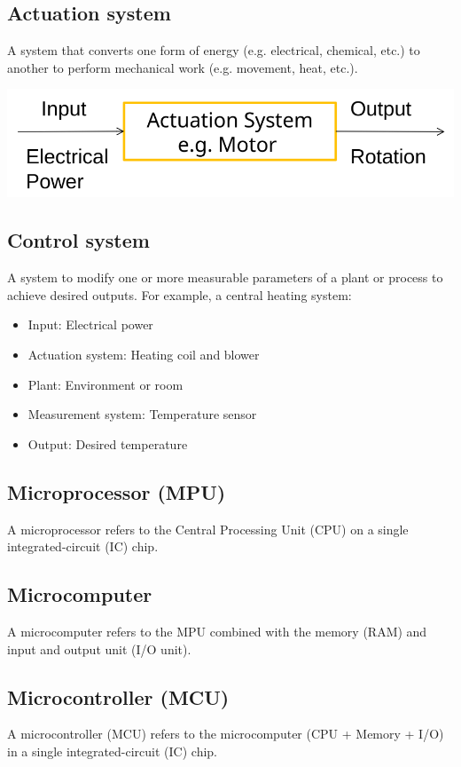 \documentclass[11pt]{article}
\begin{document}
\subsection{Actuation system}
\label{sec:org3e09752}
A system that converts one form of energy (e.g. electrical, chemical, etc.) to another to perform mechanical work (e.g. movement, heat, etc.).
\begin{center}
\includegraphics[width=.9\linewidth]{./images/actuation-system.png}
\end{center}
\subsection{Control system}
\label{sec:org28db679}
A system to modify one or more measurable parameters of a plant or process to achieve desired outputs. For example, a central heating system:
\begin{itemize}
\item Input: Electrical power
\item Actuation system: Heating coil and blower
\item Plant: Environment or room
\item Measurement system: Temperature sensor
\item Output: Desired temperature
\end{itemize}
\subsection{Microprocessor (MPU)}
\label{sec:org82c3bbb}
A microprocessor refers to the Central Processing Unit (CPU) on a single integrated-circuit (IC) chip.
\subsection{Microcomputer}
\label{sec:org44afd62}
A microcomputer refers to the MPU combined with the memory (RAM) and input and output unit (I/O unit).
\subsection{Microcontroller (MCU)}
\label{sec:orge841101}
A microcontroller (MCU) refers to the microcomputer (CPU + Memory + I/O) in a single integrated-circuit (IC) chip.
\end{document}
